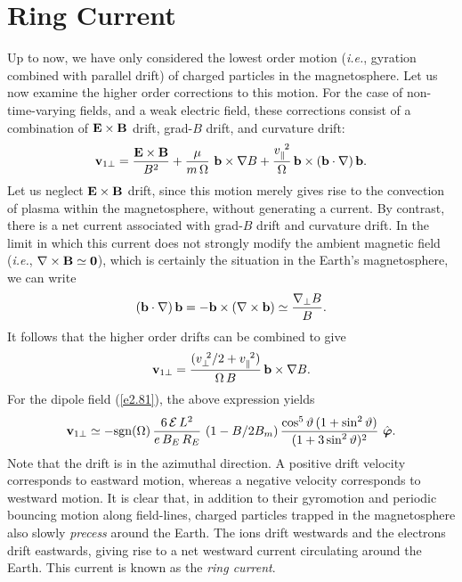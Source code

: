 \section{Ring Current}
Up to now, we have only considered the lowest order motion ({\em i.e.}, 
gyration combined with parallel drift) of charged particles in the
magnetosphere. Let us now examine the higher order corrections to this
motion. For the case of non-time-varying fields, and  a weak electric
field, these corrections consist of a combination of ${\bf E}\times{\bf B}$ drift,
grad-$B$ drift, and curvature drift:
\begin{equation}
{\bf v}_{1\perp} = \frac{{\bf E}\times{\bf B}}{B^2} + \frac{\mu}{m\,{\Omega}}
\,\,{\bf b}\times\nabla B +\frac{ v_\parallel^{~2} }{{\Omega}}\,
{\bf b}\times({\bf b}\cdot\nabla)\,{\bf b}.
\end{equation}
Let us neglect ${\bf E}\times{\bf B}$ drift, since this motion merely gives
rise to the convection of plasma within the magnetosphere, without generating a
current. By contrast, there is a net current associated with  grad-$B$ drift
and curvature drift. In the limit in which this current does not strongly
modify the ambient magnetic field ({\em i.e.},
 $\nabla\times{\bf B} \simeq {\bf 0}$),
which is certainly the situation in the Earth's magnetosphere, we can write
\begin{equation}
({\bf b}\cdot\nabla)\,{\bf b} =-{\bf b}\times(\nabla\times
{\bf b})\simeq \frac{\nabla_\perp B}{B}.
\end{equation}
It follows that the higher order drifts can be combined to give
\begin{equation}
{\bf v}_{1\perp} = \frac{(v_\perp^{~2}/2+v_\parallel^{~2})}{{\Omega}\,B}\,
{\bf b}\times\nabla B.
\end{equation}
For the dipole field (\ref{e2.81}), the above expression yields
\begin{equation}
{\bf v}_{1\perp} \simeq -{\rm sgn}({\Omega})\,\frac{6\,{\cal E}\,L^2}{e\,B_E\,R_E} \,\,
(1-B/2B_m)\,\frac{\cos^5\vartheta\,(1+\sin^2\vartheta)}{(1+3\sin^2\vartheta)^2}\,\,
\hat{\bvarphi}.\label{e2.101}
\end{equation}
Note that the drift is in the azimuthal direction. A positive drift velocity
corresponds
to eastward motion, whereas a negative velocity corresponds to westward motion.
It is  clear that, in addition to their gyromotion and  periodic
bouncing motion along field-lines, charged particles trapped
in the magnetosphere also
slowly {\em precess}\/ around the Earth. The ions drift westwards and the electrons
drift eastwards, giving rise to a net westward current circulating around the
Earth. This current is known as the {\em ring current}.

